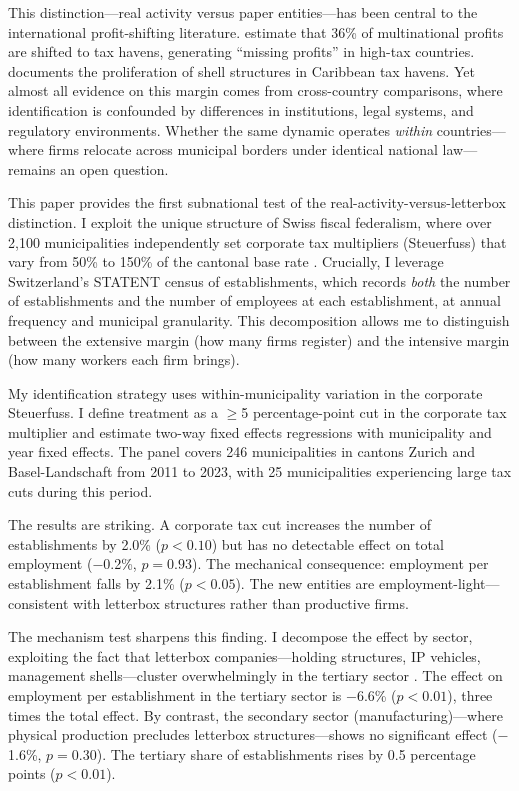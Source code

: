 \documentclass[12pt]{article}
\begin{document}
This distinction---real activity versus paper entities---has been central to the international profit-shifting literature. \citet{torslov2023missing} estimate that 36\% of multinational profits are shifted to tax havens, generating ``missing profits'' in high-tax countries. \citet{dharmapala2008what} documents the proliferation of shell structures in Caribbean tax havens. Yet almost all evidence on this margin comes from cross-country comparisons, where identification is confounded by differences in institutions, legal systems, and regulatory environments. Whether the same dynamic operates \textit{within} countries---where firms relocate across municipal borders under identical national law---remains an open question.

This paper provides the first subnational test of the real-activity-versus-letterbox distinction. I exploit the unique structure of Swiss fiscal federalism, where over 2,100 municipalities independently set corporate tax multipliers (Steuerfuss) that vary from 50\% to 150\% of the cantonal base rate \citep{brulhart2012agglomeration, brulhart2015taxes}. Crucially, I leverage Switzerland's STATENT census of establishments, which records \textit{both} the number of establishments and the number of employees at each establishment, at annual frequency and municipal granularity. This decomposition allows me to distinguish between the extensive margin (how many firms register) and the intensive margin (how many workers each firm brings).

My identification strategy uses within-municipality variation in the corporate Steuerfuss. I define treatment as a $\geq$5 percentage-point cut in the corporate tax multiplier and estimate two-way fixed effects regressions with municipality and year fixed effects. The panel covers 246 municipalities in cantons Zurich and Basel-Landschaft from 2011 to 2023, with 25 municipalities experiencing large tax cuts during this period.

The results are striking. A corporate tax cut increases the number of establishments by 2.0\% ($p < 0.10$) but has no detectable effect on total employment ($-$0.2\%, $p = 0.93$). The mechanical consequence: employment per establishment falls by 2.1\% ($p < 0.05$). The new entities are employment-light---consistent with letterbox structures rather than productive firms.

The mechanism test sharpens this finding. I decompose the effect by sector, exploiting the fact that letterbox companies---holding structures, IP vehicles, management shells---cluster overwhelmingly in the tertiary sector \citep{desai2006demand}. The effect on employment per establishment in the tertiary sector is $-$6.6\% ($p < 0.01$), three times the total effect. By contrast, the secondary sector (manufacturing)---where physical production precludes letterbox structures---shows no significant effect ($-$1.6\%, $p = 0.30$). The tertiary share of establishments rises by 0.5 percentage points ($p < 0.01$).
\end{document}
